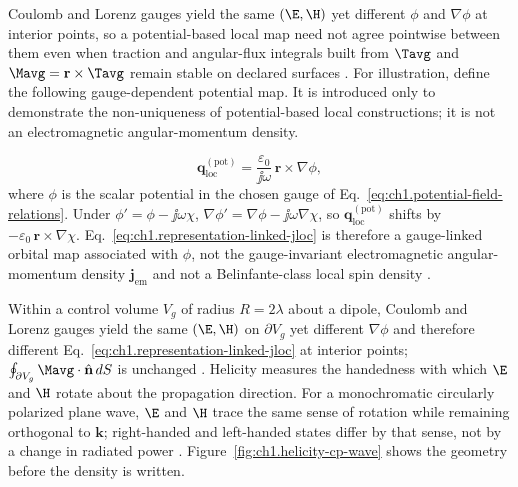 Coulomb and Lorenz gauges yield the same \((\E,\H)\) yet different \(\phi\) and \(\nabla\phi\) at interior points, so a potential-based local map need not agree pointwise between them even when traction and angular-flux integrals built from $\Tavg$ and $\Mavg=\mathbf{r}\times\Tavg$ remain stable on declared surfaces \cite{belinfante1940,maxwell1873}. For illustration, define the following gauge-dependent potential map. It is introduced only to demonstrate the non-uniqueness of potential-based local constructions; it is not an electromagnetic angular-momentum density.

\begin{equation}
\label{eq:ch1.representation-linked-jloc}
\mathbf{q}_{\mathrm{loc}}^{(\mathrm{pot})}
=
\frac{\varepsilon_0}{\jj\omega}\,\mathbf{r}\times\nabla\phi,
\end{equation}
where \(\phi\) is the scalar potential in the chosen gauge of Eq.~\eqref{eq:ch1.potential-field-relations}. Under \(\phi'=\phi-\jj\omega\chi\), \(\nabla\phi'=\nabla\phi-\jj\omega\nabla\chi\), so \(\mathbf{q}_{\mathrm{loc}}^{(\mathrm{pot})}\) shifts by \(-\varepsilon_0\,\mathbf{r}\times\nabla\chi\). Eq.~\eqref{eq:ch1.representation-linked-jloc} is therefore a gauge-linked orbital map associated with \(\phi\), not the gauge-invariant electromagnetic angular-momentum density \(\mathbf{j}_{\mathrm{em}}\) and not a Belinfante-class local spin density \cite{belinfante1940,stratton1941}.

Within a control volume $V_g$ of radius $R=2\lambda$ about a dipole, Coulomb and Lorenz gauges yield the same \((\E,\H)\) on \(\partial V_g\) yet different \(\nabla\phi\) and therefore different Eq.~\eqref{eq:ch1.representation-linked-jloc} at interior points; \(\oint_{\partial V_g}\Mavg\cdot\hat{\mathbf{n}}\,dS\) is unchanged \cite{belinfante1940,stratton1941}. Helicity measures the handedness with which $\E$ and $\H$ rotate about the propagation direction. For a monochromatic circularly polarized plane wave, $\E$ and $\H$ trace the same sense of rotation while remaining orthogonal to $\mathbf{k}$; right-handed and left-handed states differ by that sense, not by a change in radiated power \cite{stratton1941}. Figure~\ref{fig:ch1.helicity-cp-wave} shows the geometry before the density is written.

